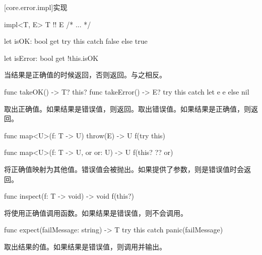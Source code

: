 [core.error.impl]{实现}

\begin{itemdecl}
impl<T, E> T !! E { /* ... */ }
\end{itemdecl}

\begin{itemdecl}
let isOK: bool {
    get {
        try this catch { false } else { true }
    }
}

let isError: bool {
    get { !this.isOK }
}
\end{itemdecl}

\pnum
{}当结果是正确值的时候返回，否则返回。与之相反。

\begin{itemdecl}
func takeOK() -> T? { this? }
func takeError() -> E? { try this catch let e { e } else { nil } }
\end{itemdecl}

\pnum
{}取出正确值。如果结果是错误值，则返回。取出错误值。如果结果是正确值，则返回。

\begin{itemdecl}
func map<U>(f: T -> U) throw(E) -> U {
    f(try this)
}

func map<U>(f: T -> U, or or: U) -> U {
    f(this? ?? or)
}
\end{itemdecl}

\pnum
{}将正确值映射为其他值。错误值会被抛出。如果提供了参数，则是错误值时会返回。

\begin{itemdecl}
func inspect(f: T -> void) -> void {
    f(this?)
}
\end{itemdecl}

\pnum
{}将使用正确值调用函数。如果结果是错误值，则不会调用。

\begin{itemdecl}
func expect(failMessage: string) -> T {
    try this catch { panic(failMessage) }
}
\end{itemdecl}

\pnum
{}取出结果的值。如果结果是错误值，则调用并输出。

